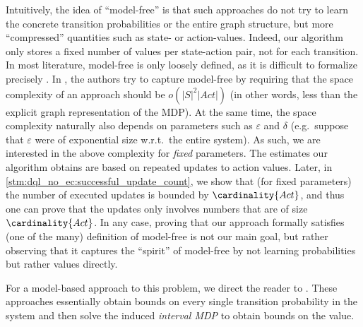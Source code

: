 \documentclass{article}
\newcommand{\States}{S}
\newcommand{\Actions}{Act}
\begin{document}
\begin{remark} \label{rem:model_free}
	Intuitively, the idea of \enquote{model-free} is that such approaches do not try to learn the concrete transition probabilities or the entire graph structure, but more \enquote{compressed} quantities such as state- or action-values.
	Indeed, our algorithm only stores a fixed number of values per state-action pair, not for each transition.
	In most literature, model-free is only loosely defined, as it is difficult to formalize precisely \cite{DBLP:conf/icml/StrehlLWLL06}.
	In \cite[Definition~1]{DBLP:conf/icml/StrehlLWLL06}, the authors try to capture model-free by requiring that the space complexity of an approach should be $o(|\States|^2 |\Actions|)$ (in other words, less than the explicit graph representation of the MDP).
	At the same time, the space complexity naturally also depends on parameters such as $\varepsilon$ and $\delta$ (e.g.\ suppose that $\varepsilon$ were of exponential size w.r.t.\ the entire system).
	As such, we are interested in the above complexity for \emph{fixed} parameters.
	The estimates our algorithm obtains are based on repeated updates to action values.
	Later, in \cref{stm:dql_no_ec:successful_update_count}, we show that (for fixed parameters) the number of executed updates is bounded by $\cardinality{\Actions}$, and thus one can prove that the updates only involves numbers that are of size $\cardinality{\Actions}$.
	In any case, proving that our approach formally satisfies (one of the many) definition of model-free is not our main goal, but rather observing that it captures the \enquote{spirit} of model-free by not learning probabilities but rather values directly.

	For a model-based approach to this problem, we direct the reader to \cite{DBLP:conf/cav/AshokKW19,DBLP:journals/corr/abs-2404-05424}.
	These approaches essentially obtain bounds on every single transition probability in the system and then solve the induced \emph{interval MDP} to obtain bounds on the value.
\end{remark}
\end{document}
